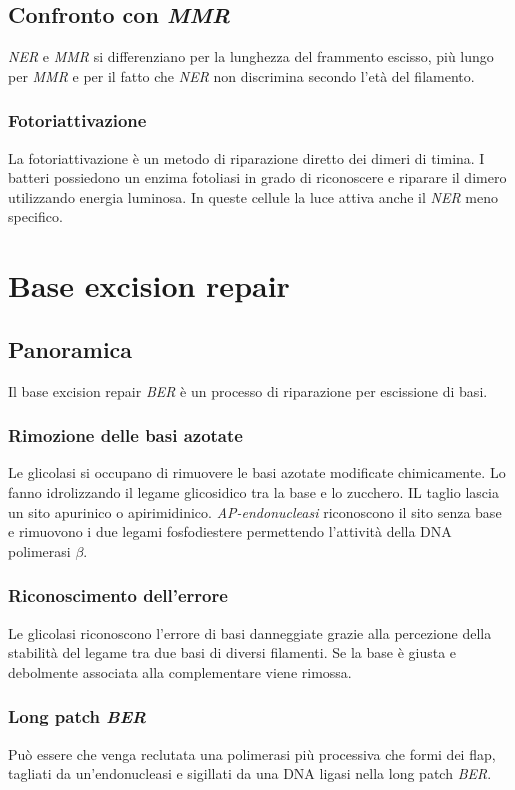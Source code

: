 	\subsection{Confronto con \emph{MMR}}
	\emph{NER} e \emph{MMR} si differenziano per la lunghezza del frammento escisso, pi\`u lungo per \emph{MMR} e per il fatto che \emph{NER} non discrimina secondo l'et\`a del filamento.

		\subsubsection{Fotoriattivazione}
		La fotoriattivazione \`e un metodo di riparazione diretto dei dimeri di timina.
		I batteri possiedono un enzima fotoliasi in grado di riconoscere e riparare il dimero utilizzando energia luminosa.
		In queste cellule la luce attiva anche il \emph{NER} meno specifico.

\section{Base excision repair}

	\subsection{Panoramica}
	Il base excision repair \emph{BER} \`e un processo di riparazione per escissione di basi.

		\subsubsection{Rimozione delle basi azotate}
		Le glicolasi si occupano di rimuovere le basi azotate modificate chimicamente.
		Lo fanno idrolizzando il legame glicosidico tra la base e lo zucchero.
		IL taglio lascia un sito apurinico o apirimidinico.
		\emph{AP-endonucleasi}  riconoscono il sito senza base e rimuovono i due legami fosfodiestere permettendo l'attivit\`a della DNA polimerasi $\beta$.

		\subsubsection{Riconoscimento dell'errore}
		Le glicolasi riconoscono l'errore di basi danneggiate grazie alla percezione della stabilit\`a del legame tra due basi di diversi filamenti.
		Se la base \`e giusta e debolmente associata alla complementare viene rimossa.

		\subsubsection{Long patch \emph{BER}}
		Pu\`o essere che venga reclutata una polimerasi pi\`u processiva che formi dei flap, tagliati da un'endonucleasi e sigillati da una DNA ligasi nella long patch \emph{BER}.

